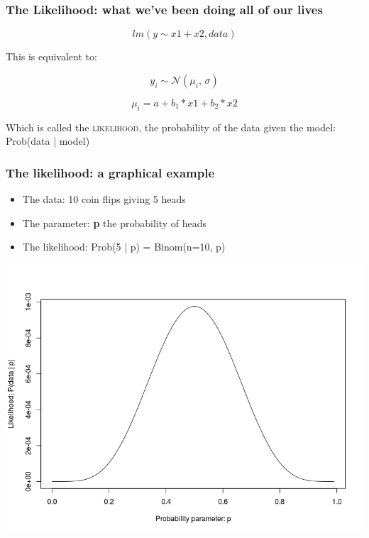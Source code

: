 \documentclass{beamer}
\begin{document}
 
 \begin{frame}
  \frametitle{\bf The Likelihood: what we've been doing all of our lives}
  
 \[
  lm(y \sim x1 + x2, data)
 \]

  
  This is equivalent to:
  
  \[
   y_i \sim \mathcal{N}(\mu_i,\, \sigma)   
   \]
   
   \[
    \mu_i = a + b_1 * x1 + b_2 * x2
   \]

Which is called the \textsc{likelihood}, the probability of the data given the model: Prob(data | model) 
   
  
  
 \end{frame}
 
 \begin{frame}
  \frametitle{\bf The likelihood: a graphical example}
  
  \begin{itemize}
   \item The data: 10 coin flips giving 5 heads
   \item The parameter: \textbf{p} the probability of heads
   \item The likelihood: Prob(5 | p) = Binom(n=10, p)
  \end{itemize}

  
  \includegraphics[width=\textwidth,height=.7\textheight,keepaspectratio]{likelihood.png}
  

  
 \end{frame}
\end{document}

